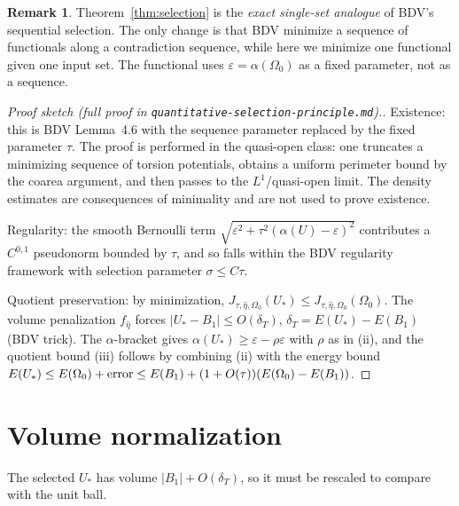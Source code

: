 \documentclass[11pt]{article}
\theoremstyle{definition}
\newtheorem{remark}[theorem]{Remark}
\newcommand{\abs}[1]{\left|#1\right|}
\begin{document}
\begin{remark}
Theorem~\ref{thm:selection} is the \emph{exact single-set analogue} of BDV's
sequential selection. The only change is that BDV minimize a sequence of
functionals along a contradiction sequence, while here we minimize one
functional given one input set. The functional uses $\varepsilon=\alpha(\Omega_0)$
as a fixed parameter, not as a sequence.
\end{remark}

\begin{proof}[Proof sketch (full proof in \texttt{quantitative-selection-principle.md}).]
Existence: this is BDV Lemma~4.6 with the sequence parameter replaced by the
fixed parameter $\tau$. The proof is performed in the quasi-open class:
one truncates a minimizing sequence of torsion potentials, obtains a uniform
perimeter bound by the coarea argument, and then passes to the $L^1$/quasi-open
limit. The density estimates are consequences of minimality and are not used
to prove existence.

Regularity: the smooth Bernoulli term
$\sqrt{\varepsilon^2+\tau^2(\alpha(U)-\varepsilon)^2}$
contributes a $C^{0,1}$ pseudonorm bounded by $\tau$, and so falls within
the BDV regularity framework with selection parameter $\sigma\le C\tau$.

Quotient preservation: by minimization, $J_{\tau,\hat\eta,\Omega_0}(U_*)\le
J_{\tau,\hat\eta,\Omega_0}(\Omega_0)$. The volume penalization $f_{\hat\eta}$
forces $\abs{U_*-B_1}\le O(\delta_T)$, $\delta_T=E(U_*)-E(B_1)$ (BDV trick).
The $\alpha$-bracket gives
$\alpha(U_*)\ge\varepsilon-\rho\varepsilon$ with $\rho$ as in (ii), and the
quotient bound (iii) follows by combining (ii) with the energy bound
$E(U_*)\le E(\Omega_0)+\hbox{error}\le E(B_1)+(1+O(\tau))(E(\Omega_0)-E(B_1))$.
\end{proof}

\section{Volume normalization}\label{sec:volnorm}

The selected $U_*$ has volume $\abs{B_1}+O(\delta_T)$, so it must be
rescaled to compare with the unit ball.
\end{document}
